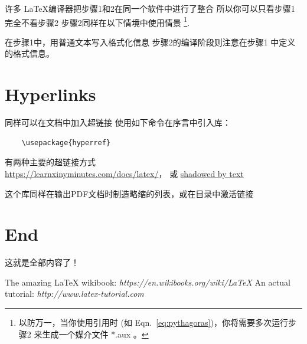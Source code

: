 \documentclass[12pt,UTF8]{article}
\begin{document}
许多 \LaTeX \hspace{1pt}编译器把步骤1和2在同一个软件中进行了整合
所以你可以只看步骤1完全不看步骤2
步骤2同样在以下情境中使用情景 \footnote{以防万一，当你使用引用时
 (如 Eqn.~\ref{eq:pythagoras})，你将需要多次运行步骤2
来生成一个媒介文件 *.aux 。}.

在步骤1中，用普通文本写入格式化信息
步骤2的编译阶段则注意在步骤1 中定义的格式信息。

\section{Hyperlinks}
同样可以在文档中加入超链接
使用如下命令在序言中引入库：
\begin{verbatim} 
    \usepackage{hyperref}
\end{verbatim}

有两种主要的超链接方式 \\
\url{https://learnxinyminutes.com/docs/latex/}， 或  
\href{https://learnxinyminutes.com/docs/latex/}{shadowed by text}

这个库同样在输出PDF文档时制造略缩的列表，或在目录中激活链接


\section{End}

这就是全部内容了！

\begin{thebibliography}{1}
   The amazing \LaTeX \hspace{1pt} wikibook: {\em 
https://en.wikibooks.org/wiki/LaTeX}
   An actual tutorial: {\em http://www.latex-tutorial.com}
\end{thebibliography}

\end{document}
